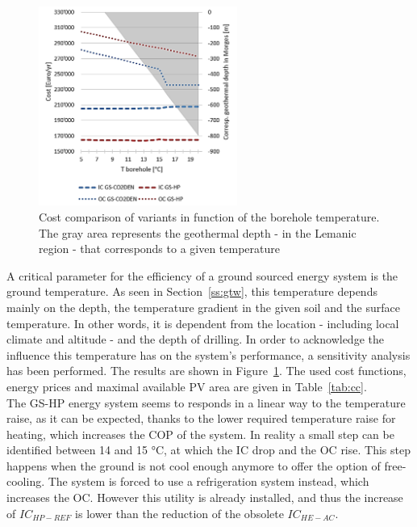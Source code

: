 \documentclass{article}
\begin{document}
\begin{figure} 
	\vspace{-20pt}
	\centering
	\includegraphics[width=0.58\textwidth]{V_SA_Tg.png}
	\caption{Cost comparison of variants in function of the borehole temperature. The gray area represents the geothermal depth - in the Lemanic region - that corresponds to a given temperature}
	\label{fig:V_SA_Tg}
	\vspace{-10pt}
\end{figure}

A critical parameter for the efficiency of a ground sourced energy system is the ground temperature. As seen in Section~\ref{ss:gtw}, this temperature depends mainly on the depth, the temperature gradient in the given soil and the surface temperature. In other words, it is dependent from the location - including local climate and altitude - and the depth of drilling. In order to acknowledge the influence this temperature has on the system's performance, a sensitivity analysis has been performed. The results are shown in Figure~\ref{fig:V_SA_Tg}. The used cost functions, energy prices and maximal available PV area are given in Table~\ref{tab:cc}. \\ 

The GS-HP energy system seems to responds in a linear way to the temperature raise, as it can be expected, thanks to the lower required temperature raise for heating, which increases the COP of the system. In reality a small step can be identified between 14 and 15 \si{\celsius}, at which the IC drop and the OC rise. This step happens when the ground is not cool enough anymore to offer the option of free-cooling. The system is forced to use a refrigeration system instead, which increases the OC. However this utility is already installed, and thus the increase of $IC_{HP-REF}$ is lower than the reduction of the obsolete $IC_{HE-AC}$.
\end{document}
